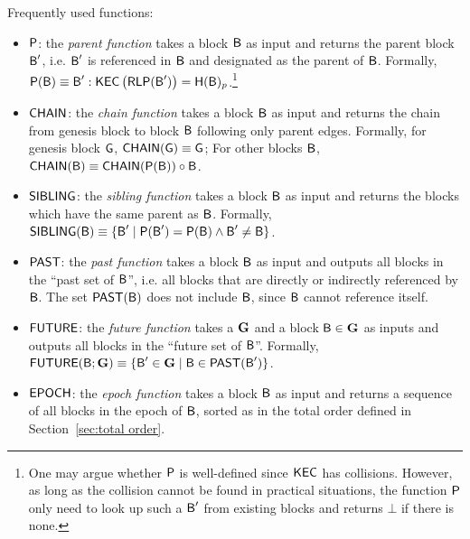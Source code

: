 \smallskip

Frequently used functions:
\begin{itemize}[nosep]
	\item $\mathsf{P}$: the \emph{parent function}  takes a block $\textsf{B}$ as input and returns the parent block $\textsf{B}'$, i.e. $\textsf{B}'$ is referenced in $\textsf{B}$ and designated as the parent of $\textsf{B}$.
	Formally, $\mathsf{P}(\textsf{B})\equiv \textsf{B}':\mathsf{KEC}\left(\mathsf{RLP}(\textsf{B}')\right)=\textsf{H}(\textsf{B})_{p}$.\footnote{One may argue whether $\mathsf{P}$ is well-defined since $\mathsf{KEC}$ has collisions. However, as long as the collision cannot be found in practical situations, the function $\mathsf{P}$ only need to look up such a $\textsf{B}'$ from existing blocks and returns $\bot$ if there is none.}

	\item $\mathsf{CHAIN}$: the \emph{chain function} takes a block $\textsf{B}$ as input and returns the chain from genesis block to block $\textsf{B}$ following only parent edges. Formally, for genesis block $\textsf{G}$, $\mathsf{CHAIN}(\textsf{G})\equiv\textsf{G}$; For other blocks $\textsf{B}$, $\mathsf{CHAIN}(\textsf{B})\equiv\mathsf{CHAIN}(\mathsf{P}(\textsf{B}))\circ \textsf{B}$.
	
	\item $\mathsf{SIBLING}$: the \emph{sibling function} takes a block $\textsf{B}$ as input and returns the blocks which have the same parent as $\textsf{B}$. Formally, $\mathsf{SIBLING}(\textsf{B})\equiv\{\textsf{B}' \;|\; \mathsf{P}(\textsf{B}')=\mathsf{P}(\textsf{B}) \wedge \textsf{B}'\neq \textsf{B}\}$.

	\item $\mathsf{PAST}$: the \emph{past function}  takes a block $\textsf{B}$ as input and outputs all blocks in the ``past set of $\textsf{B}$'', i.e. all blocks that are directly or indirectly referenced by $\textsf{B}$.
	The set $\mathsf{PAST}(\textsf{B})$ does not include $\textsf{B}$, since $\textsf{B}$ cannot reference itself.
	
	\item $\mathsf{FUTURE}$: the \emph{future function} takes a \tg $\textbf{G}$ and a block $\textsf{B}\in\textbf{G}$ as inputs and outputs all blocks in the  ``future set of $\textsf{B}$''. Formally, $\mathsf{FUTURE}(\textsf{B};\textbf{G})\equiv\{\textsf{B}' \in \textbf{G} \mid \textsf{B} \in \mathsf{PAST}(\textsf{B}')\}$. 

	\item $\mathsf{EPOCH} $: the \emph{epoch function} takes a block $\textsf{B}$ as input and returns a sequence of all blocks in the epoch of $\textsf{B}$, sorted as in the \name total order defined in Section~\ref{sec:total order}.



\end{itemize}
